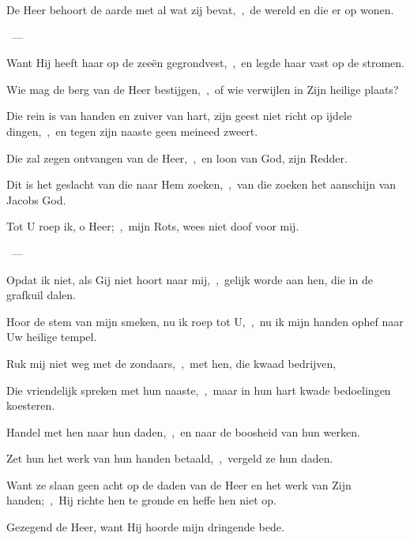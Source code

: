 \documentclass[12pt,twoside,a5paper]{article}
\begin{document}

\begin{halfparskip}
   De Heer behoort de aarde met al wat zij bevat,~\sep\ de wereld en die er op wonen.

  ~--- 

  Want Hij heeft haar op de zeeën gegrondvest,~\sep\ en legde haar vast op de stromen.

  Wie mag de berg van de Heer bestijgen,~\sep\ of wie verwijlen in Zijn heilige plaats?

  Die rein is van handen en zuiver van hart, zijn geest niet richt op ijdele dingen,~\sep\ en tegen zijn naaste geen meineed zweert.

  Die zal zegen ontvangen van de Heer,~\sep\ en loon van God, zijn Redder.

  Dit is het geslacht van die naar Hem zoeken,~\sep\ van die zoeken het aanschijn van Jacobs God.
\end{halfparskip}


\begin{halfparskip}
   Tot U roep ik, o Heer;~\sep\ mijn Rots, wees niet doof voor mij.

  ~--- 

  Opdat ik niet, als Gij niet hoort naar mij,~\sep\ gelijk worde aan hen, die in de grafkuil dalen.

  Hoor de stem van mijn smeken, nu ik roep tot U,~\sep\ nu ik mijn handen ophef naar Uw heilige tempel.

  Ruk mij niet weg met de zondaars,~\sep\ met hen, die kwaad bedrijven,

  Die vriendelijk spreken met hun naaste,~\sep\ maar in hun hart kwade bedoelingen koesteren.

  Handel met hen naar hun daden,~\sep\ en naar de boosheid van hun werken.

  Zet hun het werk van hun handen betaald,~\sep\ vergeld ze hun daden.

  Want ze slaan geen acht op de daden van de Heer en het werk van Zijn handen;~\sep\ Hij richte hen te gronde en heffe hen niet op.

  Gezegend de Heer, want Hij hoorde mijn dringende bede.
\end{halfparskip}
\end{document}
